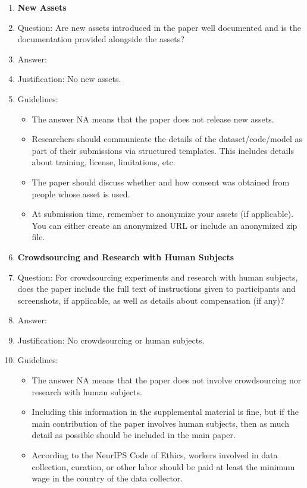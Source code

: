 \documentclass{article}
\begin{document}
{\begin{enumerate}
\item {\bf New Assets}
    \item[] Question: Are new assets introduced in the paper well documented and is the documentation provided alongside the assets?
    \item[] Answer: \answerNA{} %
    \item[] Justification: No new assets.
    \item[] Guidelines:
    \begin{itemize}
        \item The answer NA means that the paper does not release new assets.
        \item Researchers should communicate the details of the dataset/code/model as part of their submissions via structured templates. This includes details about training, license, limitations, etc.
        \item The paper should discuss whether and how consent was obtained from people whose asset is used.
        \item At submission time, remember to anonymize your assets (if applicable). You can either create an anonymized URL or include an anonymized zip file.
    \end{itemize}

\item {\bf Crowdsourcing and Research with Human Subjects}
    \item[] Question: For crowdsourcing experiments and research with human subjects, does the paper include the full text of instructions given to participants and screenshots, if applicable, as well as details about compensation (if any)?
    \item[] Answer: \answerNA{} %
    \item[] Justification: No crowdsourcing or human subjects.
    \item[] Guidelines:
    \begin{itemize}
        \item The answer NA means that the paper does not involve crowdsourcing nor research with human subjects.
        \item Including this information in the supplemental material is fine, but if the main contribution of the paper involves human subjects, then as much detail as possible should be included in the main paper.
        \item According to the NeurIPS Code of Ethics, workers involved in data collection, curation, or other labor should be paid at least the minimum wage in the country of the data collector.
    \end{itemize}


\end{enumerate}}
\end{document}
